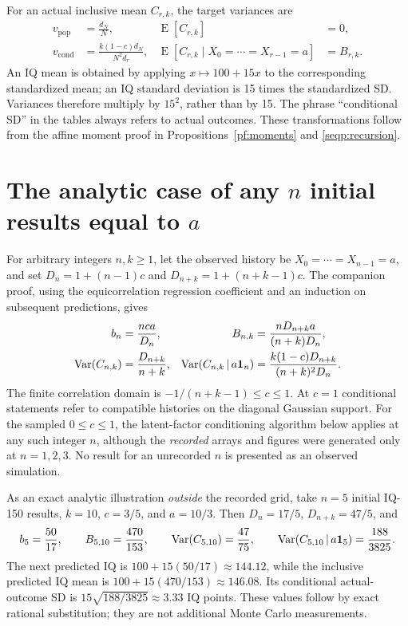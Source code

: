 For an actual inclusive mean \(C_{r,k}\), the target variances are
\begin{align}
 v_{\mathrm{pop}}&=\frac{d_N}{N},
   &\operatorname{E}[C_{r,k}]&=0,
   \label{eq:seq-sim-population}\\
 v_{\mathrm{cond}}&=\frac{k(1-c)d_N}{N^2d_r},
   &\operatorname{E}[C_{r,k}\mid X_0=\cdots=X_{r-1}=a]&=B_{r,k}.
   \label{eq:seq-sim-conditional}
\end{align}
An IQ mean is obtained by applying \(x\mapsto100+15x\) to the
corresponding standardized mean; an IQ standard deviation is 15 times
the standardized SD. Variances
therefore multiply by \(15^2\), rather than by 15. The phrase
``conditional SD'' in the tables always refers to actual outcomes.
These transformations follow from the affine moment proof in
Propositions~\ref{pf:moments} and \ref{seqp:recursion}.


\section{The analytic case of any \(n\) initial results equal to \(a\)}
\label{sec:seq-sim-arbitrary-n}
For arbitrary integers \(n,k\geq1\), let the observed history be
\(X_0=\cdots=X_{n-1}=a\), and set \(D_n=1+(n-1)c\) and
\(D_{n+k}=1+(n+k-1)c\). The companion proof, using the equicorrelation
regression coefficient and an induction on subsequent predictions, gives
\begin{align}
 b_n&=\frac{nca}{D_n},&
 B_{n,k}&=\frac{nD_{n+k}a}{(n+k)D_n},\\
 \operatorname{Var}(C_{n,k})
   &=\frac{D_{n+k}}{n+k},&
 \operatorname{Var}(C_{n,k}\,\vert\, a\mathbf1_n)
   &=\frac{k(1-c)D_{n+k}}{(n+k)^2D_n}.
 \label{eq:seq-sim-arbitrary-n}
\end{align}
The finite correlation domain is
\(-1/(n+k-1)\leq c\leq1\). At \(c=1\) conditional statements
refer to compatible histories on the diagonal Gaussian support.
For the sampled \(0\leq c\leq1\), the latent-factor conditioning
algorithm below applies at any such integer \(n\), although the
\emph{recorded} arrays and figures were generated only at \(n=1,2,3\).
No result for an unrecorded \(n\) is presented as an observed simulation.

As an exact analytic illustration \emph{outside} the recorded grid,
take \(n=5\) initial IQ-150 results, \(k=10\), \(c=3/5\), and
\(a=10/3\). Then \(D_n=17/5\), \(D_{n+k}=47/5\), and
\[
 b_5=\frac{50}{17},\qquad B_{5,10}=\frac{470}{153},\qquad
 \operatorname{Var}(C_{5,10})=\frac{47}{75},\qquad
 \operatorname{Var}(C_{5,10}\,\vert\, a\mathbf1_5)=\frac{188}{3825}.
\]
The next predicted IQ is \(100+15(50/17)\approx144.12\), while
the inclusive predicted IQ mean is
\(100+15(470/153)\approx146.08\). Its conditional actual-outcome
SD is \(15\sqrt{188/3825}\approx3.33\) IQ points.
These values follow by exact rational substitution; they are
not additional Monte Carlo measurements.

